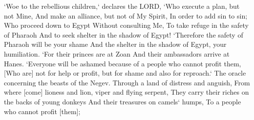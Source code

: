 \begin{scripture}[Isaiah 30:1-6]
    `Woe to the rebellious children,` declares the LORD, `Who execute a plan, but not Mine, And make an alliance, but not of My Spirit, In order to add sin to sin;
    Who proceed down to Egypt Without consulting Me, To take refuge in the safety of Pharaoh And to seek shelter in the shadow of Egypt!
    `Therefore the safety of Pharaoh will be your shame And the shelter in the shadow of Egypt, your humiliation.
    `For their princes are at Zoan And their ambassadors arrive at Hanes.
    `Everyone will be ashamed because of a people who cannot profit them, [Who are] not for help or profit, but for shame and also for reproach.`
    The oracle concerning the beasts of the Negev. Through a land of distress and anguish, From where [come] lioness and lion, viper and flying serpent, They carry their riches on the backs of young donkeys And their treasures on camels` humps, To a people who cannot profit [them];
\end{scripture}
